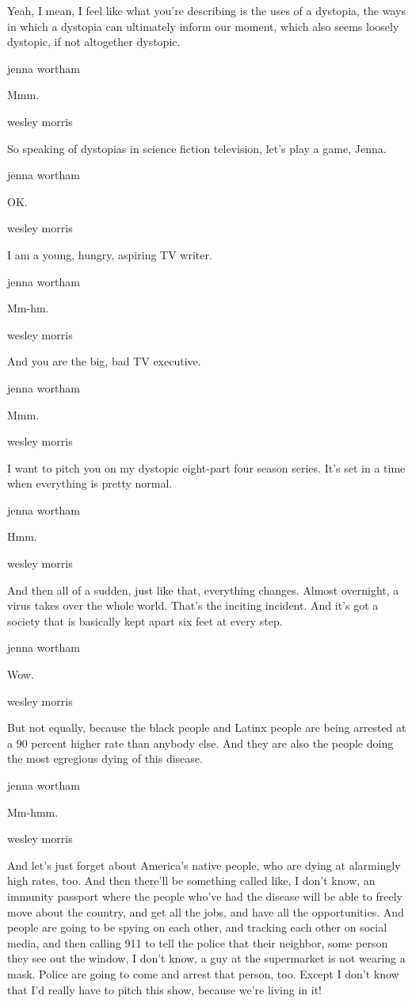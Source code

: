 Yeah, I mean, I feel like what you're describing is the uses of a
dystopia, the ways in which a dystopia can ultimately inform our moment,
which also seems loosely dystopic, if not altogether dystopic.

jenna wortham

Mmm.

wesley morris

So speaking of dystopias in science fiction television, let's play a
game, Jenna.

jenna wortham

OK.

wesley morris

I am a young, hungry, aspiring TV writer.

jenna wortham

Mm-hm.

wesley morris

And you are the big, bad TV executive.

jenna wortham

Mmm.

wesley morris

I want to pitch you on my dystopic eight-part four season series. It's
set in a time when everything is pretty normal.

jenna wortham

Hmm.

wesley morris

And then all of a sudden, just like that, everything changes. Almost
overnight, a virus takes over the whole world. That's the inciting
incident. And it's got a society that is basically kept apart six feet
at every step.

jenna wortham

Wow.

wesley morris

But not equally, because the black people and Latinx people are being
arrested at a 90 percent higher rate than anybody else. And they are
also the people doing the most egregious dying of this disease.

jenna wortham

Mm-hmm.

wesley morris

And let's just forget about America's native people, who are dying at
alarmingly high rates, too. And then there'll be something called like,
I don't know, an immunity passport where the people who've had the
disease will be able to freely move about the country, and get all the
jobs, and have all the opportunities. And people are going to be spying
on each other, and tracking each other on social media, and then calling
911 to tell the police that their neighbor, some person they see out the
window, I don't know, a guy at the supermarket is not wearing a mask.
Police are going to come and arrest that person, too. Except I don't
know that I'd really have to pitch this show, because we're living in
it!

